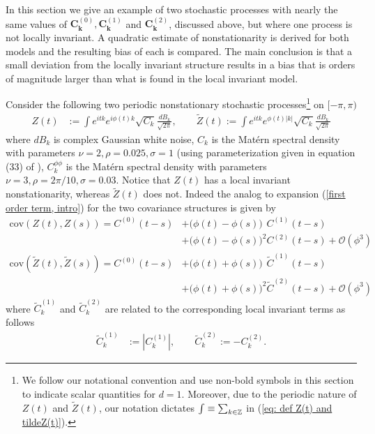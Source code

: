 \documentclass[10pt,noinfoline]{imsart}
\newcommand{\bs}{\boldsymbol}
\begin{document}
In this section we give an example of two stochastic processes with nearly the same values of $\bs C_{\bs k}^{(0)}, \bs C_{\bs k}^{(1)}$ and $\bs C_{\bs k}^{(2)}$, discussed above, but where one process is not locally invariant.  A quadratic estimate of nonstationarity is derived for both models and the resulting bias of each is compared. The main conclusion is that a small deviation from the locally invariant structure results in a bias that is orders of magnitude larger than what is found in the local invariant model.

Consider the following two periodic nonstationary stochastic processes\footnote{We follow our notational convention and use non-bold symbols in this section to indicate scalar quantities for $d=1$. Moreover, due to the periodic nature of $Z(t)$ and $\tilde Z(t)$, our notation dictates 
$\int \equiv \sum_{k\in \Bbb Z}$ in (\ref{eq: def Z(t) and tildeZ(t)}).}
 on $[-\pi,\pi)$
\begin{align}
\label{eq: def Z(t) and tildeZ(t)}
Z(t) &:= \int  e^{i tk} e^{i\phi(t)k }\sqrt{C_k}\frac{dB_{k}}{\sqrt{2\pi}},\qquad    \widetilde Z(t) := \int    e^{i tk} e^{\phi(t)|k| }\sqrt{C_k}\frac{dB_{k}}{\sqrt{2\pi}}
\end{align}
where  $dB_{k}$ is complex Gaussian white noise, $C_k$ is the Mat\'ern spectral density  with parameters $\nu = 2, \rho = 0.025, \sigma = 1$ (using parameterization given in equation (33) of \cite{stein2012interpolation}),  $C^{\phi\phi}_k$ is the Mat\'ern spectral density with parameters $\nu = 3 , \rho = 2\pi/10, \sigma = 0.03$. Notice that $Z(t)$ has a local invariant nonstationarity, whereas $\widetilde Z(t)$ does not. Indeed the analog to expansion (\ref{first order term, intro}) for the two covariance structures is given by
\begin{align}
\text{cov}(Z(t),Z(s))= C^{(0)}(t\!-\!s) &+ \big(\phi(t)-\phi(s)\big)^{\phantom{2}} C^{(1)}(t\!-\!s) \nonumber\\
									 &+ \big(\phi(t)-\phi(s)\big)^2 C^{(2)}(t\!-\!s) + \mathcal O(\phi^3)\label{eq: cov expansion cov(Z(t),Z(s))}\\
\text{cov}(\widetilde Z(t),\widetilde Z(s)) = C^{(0)}(t\!-\!s) &+ \big(\phi(t)+\phi(s)\big)^{\phantom{2}} \widetilde C^{(1)}(t\!-\!s) \nonumber\\
															&+ \big(\phi(t)+\phi(s)\big)^2 \widetilde C^{(2)}(t\!-\!s) + \mathcal O(\phi^3)\label{eq: cov expansion cov(widetilde Z(t),widetilde Z(s))}
\end{align}
where $\widetilde C^{(1)}_k$ and $\widetilde C^{(2)}_k$ are related to the corresponding local invariant terms as follows
\begin{align}
\widetilde C^{(1)}_k &:= |C^{(1)}_k|, \qquad
\widetilde C^{(2)}_k := -C^{(2)}_k.
\label{eq: comparison of invariant and non-invariant expansions}
\end{align}
\end{document}
